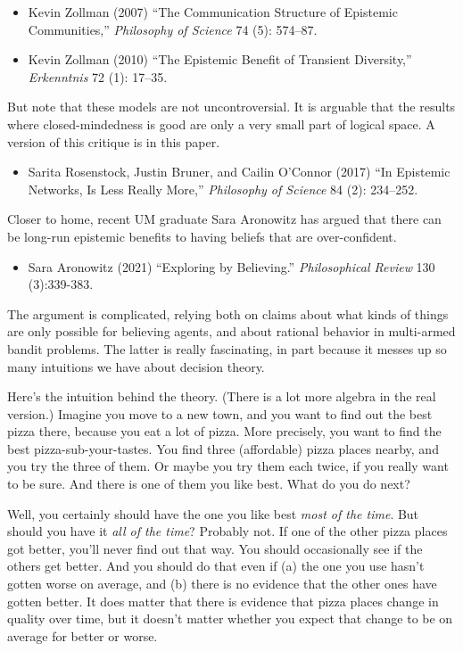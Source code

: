 \documentclass[
]{article}
\providecommand{\tightlist}{%
  \setlength{\itemsep}{0pt}\setlength{\parskip}{0pt}}
\begin{document}
\begin{itemize}
\tightlist
\item
  Kevin Zollman (2007) ``The Communication Structure of Epistemic
  Communities,'' \emph{Philosophy of Science} 74 (5): 574--87.
\item
  Kevin Zollman (2010) ``The Epistemic Benefit of Transient Diversity,''
  \emph{Erkenntnis} 72 (1): 17--35.
\end{itemize}

But note that these models are not uncontroversial. It is arguable that
the results where closed-mindedness is good are only a very small part
of logical space. A version of this critique is in this paper.

\begin{itemize}
\tightlist
\item
  Sarita Rosenstock, Justin Bruner, and Cailin O'Connor (2017) ``In
  Epistemic Networks, Is Less Really More,'' \emph{Philosophy of
  Science} 84 (2): 234--252.
\end{itemize}

Closer to home, recent UM graduate Sara Aronowitz has argued that there
can be long-run epistemic benefits to having beliefs that are
over-confident.

\begin{itemize}
\tightlist
\item
  Sara Aronowitz (2021) ``Exploring by Believing.'' \emph{Philosophical
  Review} 130 (3):339-383.
\end{itemize}

The argument is complicated, relying both on claims about what kinds of
things are only possible for believing agents, and about rational
behavior in multi-armed bandit problems. The latter is really
fascinating, in part because it messes up so many intuitions we have
about decision theory.

Here's the intuition behind the theory. (There is a lot more algebra in
the real version.) Imagine you move to a new town, and you want to find
out the best pizza there, because you eat a lot of pizza. More
precisely, you want to find the best pizza-sub-your-tastes. You find
three (affordable) pizza places nearby, and you try the three of them.
Or maybe you try them each twice, if you really want to be sure. And
there is one of them you like best. What do you do next?

Well, you certainly should have the one you like best \emph{most of the
time}. But should you have it \emph{all of the time}? Probably not. If
one of the other pizza places got better, you'll never find out that
way. You should occasionally see if the others get better. And you
should do that even if (a) the one you use hasn't gotten worse on
average, and (b) there is no evidence that the other ones have gotten
better. It does matter that there is evidence that pizza places change
in quality over time, but it doesn't matter whether you expect that
change to be on average for better or worse.
\end{document}
